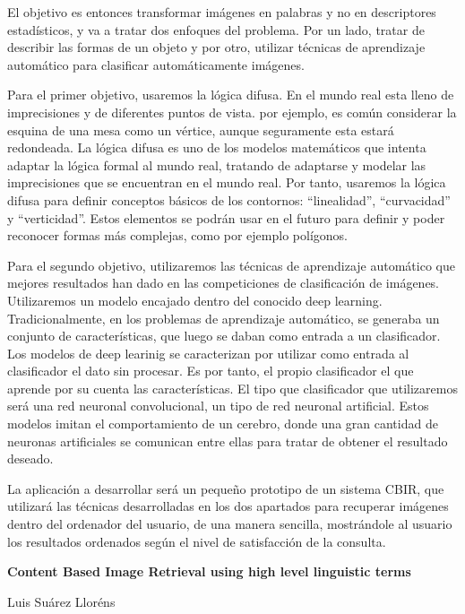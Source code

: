 El objetivo es entonces transformar imágenes en palabras y no en descriptores estadísticos, y va a tratar dos enfoques del problema. Por un lado, tratar de describir las formas de un objeto y por otro, utilizar técnicas de aprendizaje automático para clasificar automáticamente imágenes.

Para el primer objetivo, usaremos la lógica difusa. En el mundo real esta lleno de imprecisiones y de diferentes puntos de vista. por ejemplo, es común considerar la esquina de una mesa como un vértice, aunque seguramente esta estará redondeada. La lógica difusa es uno de los modelos matemáticos que intenta adaptar la lógica formal al mundo real, tratando de adaptarse y modelar las imprecisiones que se encuentran en el mundo real. Por tanto, usaremos la lógica difusa para definir conceptos básicos de los contornos: ``linealidad'', ``curvacidad'' y ``verticidad''. Estos elementos se podrán usar en el futuro para definir y poder reconocer formas más complejas, como por ejemplo polígonos.  

Para el segundo objetivo, utilizaremos las técnicas de aprendizaje automático que mejores resultados han dado en las competiciones de clasificación de imágenes. Utilizaremos un modelo encajado dentro del conocido deep learning. Tradicionalmente, en los problemas de aprendizaje automático, se generaba un conjunto de características, que luego se daban como entrada a un clasificador. Los modelos de deep learinig se caracterizan por utilizar como entrada al clasificador el dato sin procesar. Es por tanto, el propio clasificador el que aprende por su cuenta las características. El tipo que clasificador que utilizaremos será una red neuronal convolucional, un tipo de red neuronal artificial. Estos modelos imitan el comportamiento de un cerebro, donde una gran cantidad de neuronas artificiales se comunican entre ellas para tratar de obtener el resultado  deseado.

La aplicación a desarrollar será un pequeño prototipo de un sistema CBIR, que utilizará las técnicas desarrolladas en los dos apartados para recuperar imágenes dentro del ordenador del usuario, de una manera sencilla, mostrándole al usuario los resultados ordenados según el nivel de satisfacción de la consulta.
 
\cleardoublepage


\thispagestyle{empty}

\begin{center}
{\large\bfseries Content Based Image Retrieval using high level linguistic terms}\\
\end{center}
\begin{center}
Luis Suárez Lloréns\\
\end{center}

